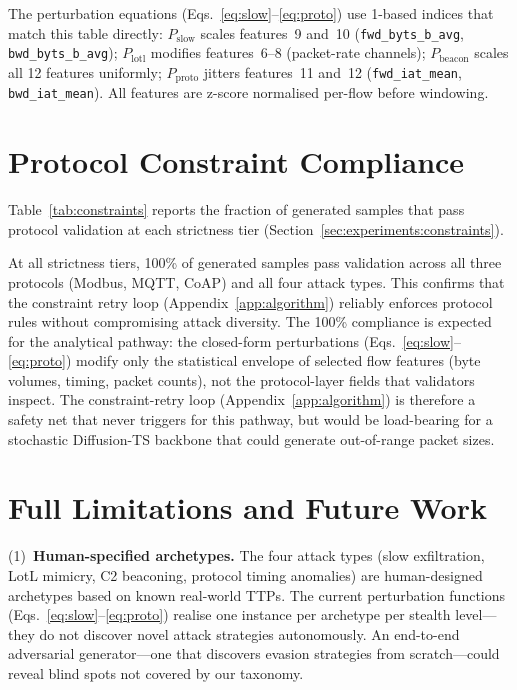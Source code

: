 The perturbation equations (Eqs.~\ref{eq:slow}--\ref{eq:proto}) use 1-based
indices that match this table directly: $P_{\text{slow}}$ scales features~9
and~10 (\texttt{fwd\_byts\_b\_avg}, \texttt{bwd\_byts\_b\_avg});
$P_{\text{lotl}}$ modifies features~6--8 (packet-rate channels);
$P_{\text{beacon}}$ scales all 12 features uniformly;
$P_{\text{proto}}$ jitters features~11 and~12 (\texttt{fwd\_iat\_mean},
\texttt{bwd\_iat\_mean}).
All features are z-score normalised per-flow before windowing.

\section{Protocol Constraint Compliance}
\label{app:constraints}

Table~\ref{tab:constraints} reports the fraction of generated samples
that pass protocol validation at each strictness tier
(Section~\ref{sec:experiments:constraints}).



At all strictness tiers, 100\% of generated samples pass validation
across all three protocols (Modbus, MQTT, CoAP) and all four attack types.
This confirms that the constraint retry loop (Appendix~\ref{app:algorithm})
reliably enforces protocol rules without compromising attack diversity.
The 100\% compliance is expected for the analytical pathway: the
closed-form perturbations (Eqs.~\ref{eq:slow}--\ref{eq:proto}) modify
only the statistical envelope of selected flow features (byte volumes,
timing, packet counts), not the protocol-layer fields that validators
inspect.  The constraint-retry loop (Appendix~\ref{app:algorithm}) is
therefore a safety net that never triggers for this pathway, but would
be load-bearing for a stochastic Diffusion-TS backbone that could
generate out-of-range packet sizes.

\section{Full Limitations and Future Work}
\label{app:limitations}

(1)~\textbf{Human-specified archetypes.}
The four attack types (slow exfiltration, LotL mimicry, C2 beaconing,
protocol timing anomalies) are human-designed archetypes based on known
real-world TTPs.  The current perturbation functions (Eqs.~\ref{eq:slow}--\ref{eq:proto}) realise
one instance per archetype per stealth level---they do not discover novel attack
strategies autonomously.  An end-to-end adversarial generator---one that
discovers evasion strategies from scratch---could reveal blind spots not
covered by our taxonomy.

